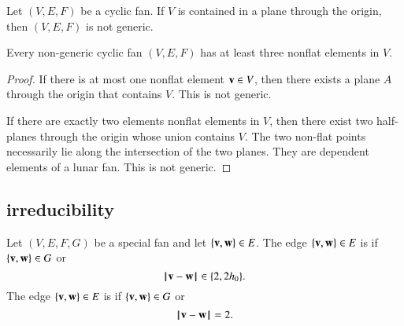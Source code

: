 \begin{lemma}
Let $(V,E,F)$ be a cyclic fan.
If $V$ is contained in a plane through the origin, then $(V,E,F)$ is not generic.
\end{lemma}

\begin{lemma}\label{lemma:3-nonflat}
Every non-generic cyclic fan $(V,E,F)$ has at least three nonflat elements in $V$.
\end{lemma}

\begin{proof}
If there is at most one nonflat element ${\mathbf v}\in V$, then there exists a plane $A$ through the origin that contains $V$.  This is not generic.

If there are exactly two elements nonflat elements in $V$, then there exist two half-planes through the origin whose union contains $V$.  The two non-flat points necessarily lie along the intersection of the two planes.  They are dependent elements of a lunar fan.  This is not generic.
\end{proof}

\subsection{irreducibility}

\begin{definition} Let $(V,E,F,G)$ be a special fan and let $\{{\mathbf v},{\mathbf w}\}\in E$.
The edge $\{{\mathbf v},{\mathbf w}\}\in E$ is  if $\{{\mathbf v},{\mathbf w}\}\in G$ or
$$
{\hskip0.1em|\hskip-0.15em|\hskip0.1em}{\mathbf v} - {\mathbf w}{\hskip0.1em|\hskip-0.15em|\hskip0.1em}\in\{2,2{h_0}\}.
$$
The edge $\{{\mathbf v},{\mathbf w}\}\in E$ is  if $\{{\mathbf v},{\mathbf w}\}\in G$ or
$$
{\hskip0.1em|\hskip-0.15em|\hskip0.1em}{\mathbf v} - {\mathbf w}{\hskip0.1em|\hskip-0.15em|\hskip0.1em}=2.
$$
\end{definition}

